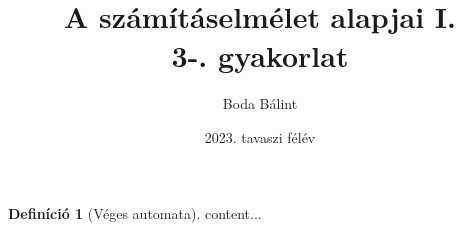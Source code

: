\documentclass[a4paper,12pt]{article}
\title{\huge{A számításelmélet alapjai I.} \\[-4pt] \large 3-. gyakorlat \vspace{-15pt}}
\author{Boda Bálint}
\date{\vspace{-12pt}2023. tavaszi félév}
\theoremstyle{definition}
\newtheorem{definition}{Definíció}
\begin{document}
	\maketitle
	\vspace{-10pt}
	
	\begin{definition}[Véges automata]
		content...
	\end{definition}
\end{document}
